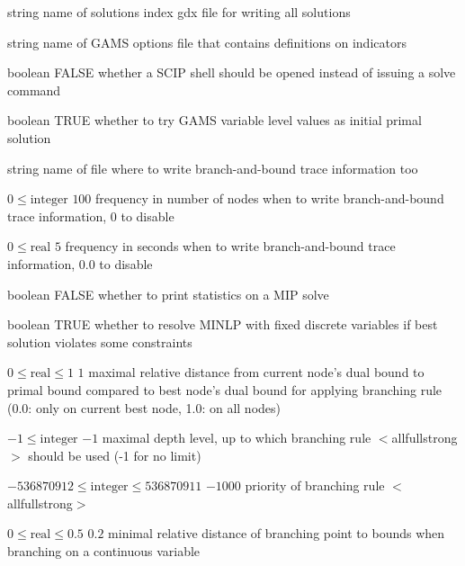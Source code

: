 %
{string}%
{}%
{name of solutions index gdx file for writing all solutions}%
{}

%
{string}%
{}%
{name of GAMS options file that contains definitions on indicators}%
{}

%
{boolean}%
{FALSE}%
{whether a SCIP shell should be opened instead of issuing a solve command}%
{}

%
{boolean}%
{TRUE}%
{whether to try GAMS variable level values as initial primal solution}%
{}

%
{string}%
{}%
{name of file where to write branch-and-bound trace information too}%
{}

%
{$0\leq\textrm{integer}$}%
{$100$}%
{frequency in number of nodes when to write branch-and-bound trace information, 0 to disable}%
{}

%
{$0\leq\textrm{real}$}%
{$5$}%
{frequency in seconds when to write branch-and-bound trace information, 0.0 to disable}%
{}

%
{boolean}%
{FALSE}%
{whether to print statistics on a MIP solve}%
{}

%
{boolean}%
{TRUE}%
{whether to resolve MINLP with fixed discrete variables if best solution violates some constraints}%
{}

%
{$0\leq\textrm{real}\leq1$}%
{$1$}%
{maximal relative distance from current node's dual bound to primal bound compared to best node's dual bound for applying branching rule (0.0: only on current best node, 1.0: on all nodes)}%
{}

%
{$-1\leq\textrm{integer}$}%
{$-1$}%
{maximal depth level, up to which branching rule $<$allfullstrong$>$ should be used (-1 for no limit)}%
{}

%
{$-536870912\leq\textrm{integer}\leq536870911$}%
{$-1000$}%
{priority of branching rule $<$allfullstrong$>$}%
{}

%
{$0\leq\textrm{real}\leq0.5$}%
{$0.2$}%
{minimal relative distance of branching point to bounds when branching on a continuous variable}%
{}

